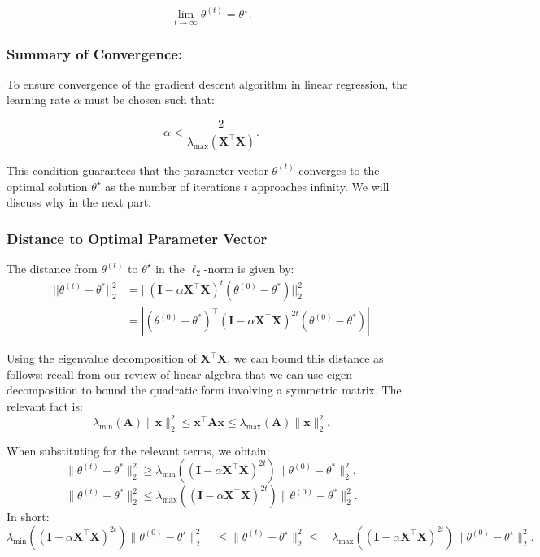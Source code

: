 \[
    \lim_{t \to \infty} \theta^{(t)} = \theta^\star.
\]

\subsubsection{Summary of Convergence:}

To ensure convergence of the gradient descent algorithm in linear regression, the learning rate \(\alpha\) must be chosen such that:

\[
    \alpha < \frac{2}{\lambda_{\max}(\boldsymbol{X}^\top \boldsymbol{X})}.
\]

This condition guarantees that the parameter vector \(\theta^{(t)}\) converges to the optimal solution \(\theta^\star\) as the number of iterations \(t\) approaches infinity. We will discuss why in the next part.

\subsubsection{Distance to Optimal Parameter Vector}

The distance from \(\theta^{(t)}\) to \(\theta^\star\) in the \(\ell_2\)-norm is given by:
\[\begin{aligned}
    ||\theta^{(t)}-\theta^{*}||_{2}^{2} & =||(\mathbf{I}-\alpha\mathbf{X}^{\top}\mathbf{X})^{t}(\theta^{(0)}-\theta^{*})||_{2}^{2}                                \\
                        & =|(\theta^{(0)}-\theta^{*})^{\top}(\mathbf{I}-\alpha\boldsymbol{X}^{\top}\boldsymbol{X})^{2t}(\theta^{(0)}-\theta^{*})|
    \end{aligned}\]


Using the eigenvalue decomposition of \(\boldsymbol{X}^\top \boldsymbol{X}\), we can bound this distance as follows: recall from our review of linear algebra that we can use eigen decomposition to bound the quadratic form involving a symmetric matrix. The relevant fact is:
\[
    \lambda_{\min}(\boldsymbol{A})\|\boldsymbol{x}\|_2^2 \leq \boldsymbol{x}^\top\boldsymbol{A}\boldsymbol{x} \leq \lambda_{\max}(\boldsymbol{A})\|\boldsymbol{x}\|_2^2.
\]

When substituting for the relevant terms, we obtain:
\[
    \|\theta^{(t)} - \theta^{*}\|_{2}^{2} \geq \lambda_{\min}((\mathbf{I} - \alpha \mathbf{X}^{\top} \mathbf{X})^{2t}) \|\theta^{(0)} - \theta^{*}\|_{2}^{2},
\]
\[
    \|\theta^{(t)} - \theta^{*}\|_{2}^{2} \leq \lambda_{\max}((\mathbf{I} - \alpha \mathbf{X}^{\top} \mathbf{X})^{2t}) \|\theta^{(0)} - \theta^{*}\|_{2}^{2}.
\]
In short:
\[
    \lambda_{\min}((\mathbf{I} - \alpha \boldsymbol{X}^\top \boldsymbol{X})^{2t}) \|\theta^{(0)} - \theta^\star\|_2^2 \quad \leq \|\theta^{(t)} - \theta^\star\|_2^2  \leq \quad \lambda_{\max}((\mathbf{I} - \alpha \boldsymbol{X}^\top \boldsymbol{X})^{2t}) \|\theta^{(0)} - \theta^\star\|_2^2.
\]

